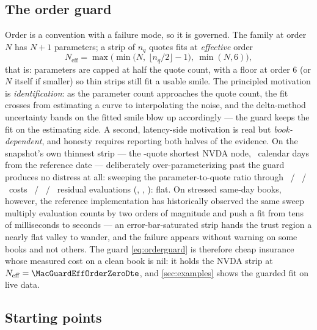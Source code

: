 \subsection{The order guard}
\label{sec:orderguard}

Order is a convention with a failure mode, so it is governed.  The family
at order $N$ has $N+1$ parameters; a strip of $n_q$ quotes fits at
\emph{effective} order
\begin{equation}
N_{\mathrm{eff}}
=\max\Big(\min\big(N,\ \lfloor n_q/2\rfloor-1\big),\ \min(N,6)\Big),
\label{eq:orderguard}
\end{equation}
that is: parameters are capped at half the quote count, with a floor at
order $6$ (or $N$ itself if smaller) so thin strips still fit a usable
smile.  The principled motivation is \emph{identification}: as the
parameter count approaches the quote count, the fit crosses from
estimating a curve to interpolating the noise, and the delta-method
uncertainty bands on the fitted smile blow up accordingly --- the guard
keeps the fit on the estimating side.  A second, latency-side
motivation is real but \emph{book-dependent}, and honesty requires
reporting both halves of the evidence.  On the snapshot's own thinnest
strip --- the \MacGuardQuoteCountZeroDte-quote shortest NVDA node,
\MacNvdaOneDayDays\ calendar days from the reference date
--- deliberately over-parameterizing past the guard produces no
distress at all: sweeping the parameter-to-quote ratio through
\MacCliffLoRatio\ / \MacCliffMidRatio\ / \MacCliffHiRatio\ costs
\MacCliffLoEvals\ / \MacCliffMidEvals\ / \MacCliffHiEvals\ residual
evaluations (\MacCliffLoMs, \MacCliffMidMs, \MacCliffHiMs): flat.  On
stressed same-day books, however, the reference implementation has
historically observed the same sweep multiply evaluation counts by two
orders of magnitude and push a fit from tens of milliseconds to
seconds --- an error-bar-saturated strip hands the trust region a
nearly flat valley to wander, and the failure appears without warning
on some books and not others.  The guard \eqref{eq:orderguard} is
therefore cheap insurance whose measured cost on a clean book is nil:
it holds the NVDA strip at
$N_{\mathrm{eff}}=\MacGuardEffOrderZeroDte$, and
\cref{sec:examples} shows the guarded fit on live data.

\subsection{Starting points}

